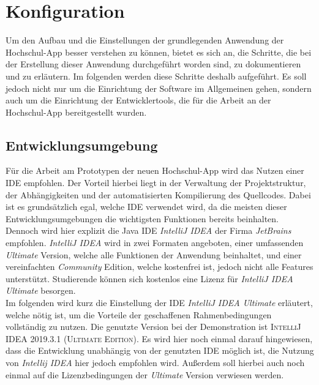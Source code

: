 \chapter{Konfiguration}
\label{sec:konfig}

Um den Aufbau und die Einstellungen der grundlegenden Anwendung der Hoch\-schul-\ac{App} besser verstehen zu können, bietet es sich an, die Schritte, die bei der Erstellung dieser Anwendung durchgeführt worden sind, zu dokumentieren und zu erläutern. Im folgenden werden diese Schritte deshalb aufgeführt. Es soll jedoch nicht nur um die Einrichtung der Software im Allgemeinen gehen, sondern auch um die Einrichtung der Entwicklertools, die für die Arbeit an der Hochschul-\ac{App} bereitgestellt wurden.

\section{Entwicklungsumgebung}
\label{sec:entwicklungsumgebung}

Für die Arbeit am Prototypen der neuen Hochschul-\ac{App} wird das Nutzen einer \ac{IDE} empfohlen. Der Vorteil hierbei liegt in der Verwaltung der Projektstruktur, der Abhängigkeiten und der automatisierten Kompilierung des Quellcodes. Dabei ist es grundsätzlich egal, welche \ac{IDE} verwendet wird, da die meisten dieser Entwicklungsumgebungen die wichtigsten Funktionen bereits beinhalten. Dennoch wird hier explizit die Java \ac{IDE} \textit{IntelliJ IDEA} der Firma \textit{JetBrains} empfohlen\autocite[Siehe][]{intellij}. \textit{IntelliJ IDEA} wird in zwei Formaten angeboten, einer umfassenden \textit{Ultimate} Version, welche alle Funktionen der Anwendung beinhaltet, und einer vereinfachten \textit{Community} Edition, welche kostenfrei ist, jedoch nicht alle Features unterstützt. Studierende können sich kostenlos eine Lizenz für \textit{IntelliJ IDEA Ultimate} besorgen.\\
\linebreak
Im folgenden wird kurz die Einstellung der \ac{IDE} \textit{IntelliJ IDEA Ultimate} erläutert, welche nötig ist, um die Vorteile der geschaffenen Rahmenbedingungen vollständig zu nutzen. Die genutzte Version bei der Demonstration ist \textsc{IntelliJ IDEA 2019.3.1 (Ultimate Edition)}. Es wird hier noch einmal darauf hingewiesen, dass die Entwicklung unabhängig von der genutzten \ac{IDE} möglich ist, die Nutzung von \textit{Intellij IDEA} hier jedoch empfohlen wird. Außerdem soll hierbei auch noch einmal auf die Lizenzbedingungen der \textit{Ultimate} Version verwiesen werden\autocite[Siehe][]{ultimate}.

